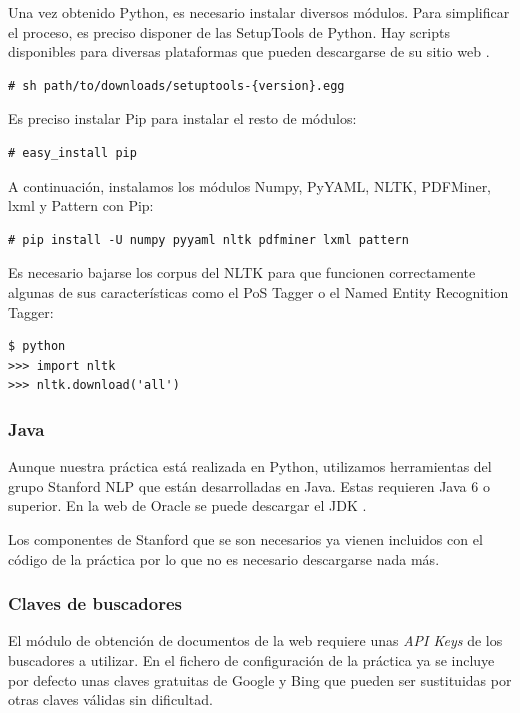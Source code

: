 \documentclass[12pt,a4paper,titlepage]{article}
\begin{document}
Una vez obtenido Python, es necesario instalar diversos módulos. Para simplificar el proceso, es preciso disponer de las SetupTools de Python. Hay scripts disponibles para diversas plataformas que pueden descargarse de su sitio web \cite{setuptools}.

\begin{lstlisting}
# sh path/to/downloads/setuptools-{version}.egg
\end{lstlisting}

Es preciso instalar Pip para instalar el resto de módulos:

\begin{lstlisting}
# easy_install pip
\end{lstlisting}

A continuación, instalamos los módulos Numpy, PyYAML, NLTK, PDFMiner, lxml y Pattern con Pip:

\begin{lstlisting}
# pip install -U numpy pyyaml nltk pdfminer lxml pattern
\end{lstlisting}

Es necesario bajarse los corpus del NLTK para que funcionen correctamente algunas de sus características como el PoS Tagger o el Named Entity Recognition Tagger:

\begin{lstlisting}
$ python
>>> import nltk
>>> nltk.download('all')
\end{lstlisting}


\subsubsection{Java}
Aunque nuestra práctica está realizada en Python, utilizamos herramientas del grupo Stanford NLP que están desarrolladas en Java. Estas requieren Java 6 o superior. En la web de Oracle se puede descargar el JDK \cite{java}.

Los componentes de Stanford que se son necesarios ya vienen incluidos con el código de la práctica por lo que no es necesario descargarse nada más.

\subsubsection{Claves de buscadores}
El módulo de obtención de documentos de la web requiere unas \emph{API Keys} de los buscadores a utilizar. En el fichero de configuración de la práctica ya se incluye por defecto unas claves gratuitas de Google y Bing que pueden ser sustituidas por otras claves válidas sin dificultad.
\end{document}
